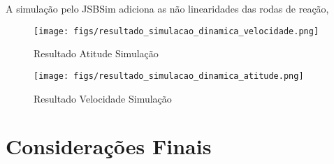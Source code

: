 A simulação pelo JSBSim adiciona as não linearidades das rodas de reação,


\begin{figure}[htpb]
	\centering
	\texttt{[image: figs/resultado\_simulacao\_dinamica\_velocidade.png]}
	\caption{Resultado Atitude Simulação}
	\label{fig:15}
\end{figure}

\begin{figure}[htpb]
	\centering
	\texttt{[image: figs/resultado\_simulacao\_dinamica\_atitude.png]}
	\caption{Resultado Velocidade Simulação}
	\label{fig:15}
\end{figure}



\section{Considerações Finais}




